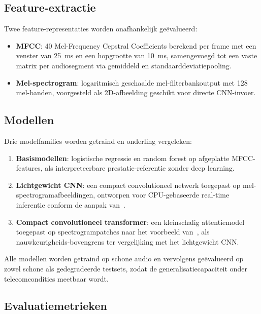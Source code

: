 \documentclass{hogent-article}
\begin{document}
\subsection{Feature-extractie}

Twee feature-representaties worden onafhankelijk geëvalueerd:

\begin{itemize}
  \item \textbf{MFCC}: 40 Mel-Frequency Cepstral Coefficients berekend per
    frame met een venster van 25~ms en een hopgrootte van 10~ms, samengevoegd
    tot een vaste matrix per audiosegment via gemiddeld en standaarddeviatiepooling.
  \item \textbf{Mel-spectrogram}: logaritmisch geschaalde mel-filterbankoutput
    met 128 mel-banden, voorgesteld als 2D-afbeelding geschikt voor directe
    CNN-invoer.
\end{itemize}

\subsection{Modellen}

Drie modelfamilies worden getraind en onderling vergeleken:

\begin{enumerate}
  \item \textbf{Basismodellen}: logistische regressie en random forest op
    afgeplatte MFCC-features, als interpreteerbare prestatie-referentie zonder
    deep learning.
  \item \textbf{Lichtgewicht CNN}: een compact convolutioneel netwerk toegepast
    op mel-spectrogramafbeeldingen, ontworpen voor CPU-gebaseerde real-time
    inferentie conform de aanpak van~\textcite{Amiriparian2022}.
  \item \textbf{Compact convolutioneel transformer}: een kleinschalig
    attentiemodel toegepast op spectrogrampatches naar het voorbeeld
    van~\textcite{Bartusiak2022}, als nauwkeurigheids-bovengrens ter vergelijking
    met het lichtgewicht CNN\@.
\end{enumerate}

Alle modellen worden getraind op schone audio en vervolgens geëvalueerd op zowel
schone als gedegradeerde testsets, zodat de generalisatiecapaciteit onder
telecomcondities meetbaar wordt.

\subsection{Evaluatiemetrieken}
\end{document}
